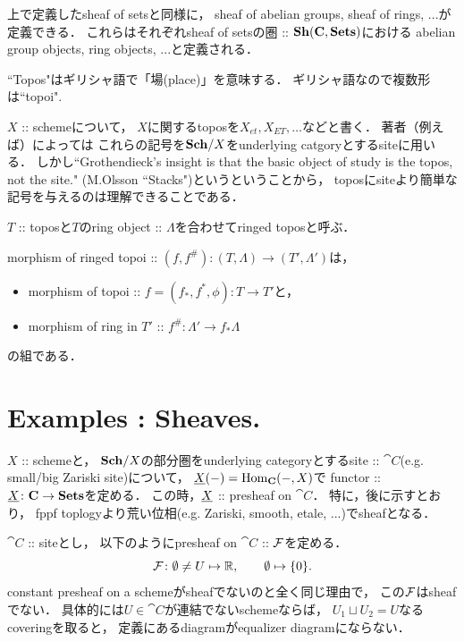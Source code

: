 \documentclass[a4paper]{jsarticle}
\begin{document}
\begin{Remark}
    上で定義したsheaf of setsと同様に，
    sheaf of abelian groups, sheaf of rings, ...が定義できる．
    これらはそれぞれsheaf of setsの圏 :: $\mathbf{Sh}(\mathbf{C}, \mathbf{Sets})$における
    abelian group objects, ring objects, ...と定義される．
\end{Remark}

\begin{Remark}
    ``Topos"はギリシャ語で「場(place)」を意味する．
    ギリシャ語なので複数形は``topoi".

    $X$ :: schemeについて，
    $X$に関するtoposを$X_{et}, X_{ET}, \dots$などと書く．
    著者（例えば\cite{StacksProj}）によっては
    これらの記号を$\mathbf{Sch}/X$をunderlying catgoryとするsiteに用いる．
    しかし``Grothendieck’s insight is that the basic object of study is the topos, not the site."
    (M.Olsson ``Stacks")というということから，
    toposにsiteより簡単な記号を与えるのは理解できることである．
\end{Remark}

\begin{Def}
\begin{myenum}{\roman*}
    \item
    $T$ :: toposと$T$のring object :: $\Lambda$を合わせてringed toposと呼ぶ．

    \item
    morphism of ringed topoi :: $(f, f^{\#}) \colon (T, \Lambda) \to (T', \Lambda')$は，
    \begin{itemize}
        \item morphism of topoi :: $f=(f_*, f^*, \phi) \colon T \to T'$と，
        \item morphism of ring in $T'$ :: $f^{\#} \colon \Lambda' \to f_* \Lambda$
    \end{itemize}
    の組である．
\end{myenum}
\end{Def}

\section{Examples : Sheaves.}
\begin{Example}
    $X$ :: schemeと，
    $\mathbf{Sch}/X$の部分圏をunderlying categoryとするsite :: $\cat{C}$(e.g. small/big Zariski site)について，
    $\underline{X}(-)=\operatorname{Hom}_{\mathbf{C}}(-, X)$で
    functor :: $\underline{X} \colon \mathbf{C} \to \mathbf{Sets}$を定める．
    この時，$\underline{X}$ :: presheaf on $\cat{C}$．
    特に，後に示すとおり，
    fppf toplogyより荒い位相(e.g. Zariski, smooth, etale, ...)でsheafとなる．
\end{Example}

\begin{Example}
    $\cat{C}$ :: siteとし，
    以下のようにpresheaf on $\cat{C}$ :: $\mathcal{F}$を定める．
    \[ \mathcal{F} \colon \emptyset \neq U \mapsto \mathbb{R}, \qquad \emptyset \mapsto \{0\}.  \]
    constant presheaf on a schemeがsheafでないのと全く同じ理由で，
    この$\mathcal{F}$はsheafでない．
    具体的には$U \in \cat{C}$が連結でないschemeならば，
    $U_1 \sqcup U_2=U$なるcoveringを取ると，
    定義にあるdiagramがequalizer diagramにならない．
\end{Example}




\end{document}
